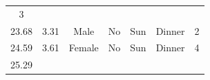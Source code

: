 \documentclass[]{article}
\theoremstyle{definition}
\theoremstyle{definition}
\theoremstyle{definition}
\theoremstyle{remark}
\begin{document}
\begin{longtable}[]{@{}ccccccc@{}}
\begin{minipage}[t]{0.07\columnwidth}
3\strut
\end{minipage}\tabularnewline
\begin{minipage}[t]{0.15\columnwidth}\centering\strut
23.68\strut
\end{minipage} & \begin{minipage}[t]{0.08\columnwidth}\centering\strut
3.31\strut
\end{minipage} & \begin{minipage}[t]{0.10\columnwidth}\centering\strut
Male\strut
\end{minipage} & \begin{minipage}[t]{0.10\columnwidth}\centering\strut
No\strut
\end{minipage} & \begin{minipage}[t]{0.07\columnwidth}\centering\strut
Sun\strut
\end{minipage} & \begin{minipage}[t]{0.10\columnwidth}\centering\strut
Dinner\strut
\end{minipage} & \begin{minipage}[t]{0.07\columnwidth}\centering\strut
2\strut
\end{minipage}\tabularnewline
\begin{minipage}[t]{0.15\columnwidth}\centering\strut
24.59\strut
\end{minipage} & \begin{minipage}[t]{0.08\columnwidth}\centering\strut
3.61\strut
\end{minipage} & \begin{minipage}[t]{0.10\columnwidth}\centering\strut
Female\strut
\end{minipage} & \begin{minipage}[t]{0.10\columnwidth}\centering\strut
No\strut
\end{minipage} & \begin{minipage}[t]{0.07\columnwidth}\centering\strut
Sun\strut
\end{minipage} & \begin{minipage}[t]{0.10\columnwidth}\centering\strut
Dinner\strut
\end{minipage} & \begin{minipage}[t]{0.07\columnwidth}\centering\strut
4\strut
\end{minipage}\tabularnewline
\begin{minipage}[t]{0.15\columnwidth}\centering\strut
25.29\strut
\end{minipage} & \begin{minipage}[t]{0.08\columnwidth}\centering\strut

\end{minipage}
\end{longtable}
\end{document}
